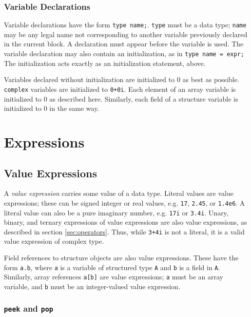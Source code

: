 \documentclass[11pt]{article}
\begin{document}
\subsubsection{Variable Declarations}

Variable declarations have the form \lstinline|type name;|.  \lstinline|type|
must be a data type; \lstinline|name| may be any legal name not
corresponding to another variable previously declared in the current
block.  A declaration must appear before the variable is used.  The
variable declaration may also contain an initialization, as in
\lstinline|type name = expr;|  The initialization acts exactly as an
initialization statement, above.

Variables declared without initialization are initialized to 0 as best
as possible.  \lstinline|complex| variables are initialized to
\lstinline|0+0i|.  Each element of an array variable is initialized to
0 as described here.  Similarly, each field of a structure variable is
initialized to 0 in the same way.

\section{Expressions}

\subsection{Value Expressions}
\label{sec:expr-value}

A \emph{value expression} carries some value of a data type.  Literal
values are value expressions; these can be signed integer or real
values, e.g. \lstinline|17|, \lstinline|2.45|, or \lstinline|1.4e6|.  A literal value
can also be a pure imaginary number, e.g. \lstinline|17i| or \lstinline|3.4i|.
Unary, binary, and ternary expressions of value expressions are also
value expressions, as described in section \ref{sec:operators}.  Thus,
while \lstinline|3+4i| is not a literal, it is a valid value expression of
complex type.

Field references to structure objects are also value expressions.
These have the form \lstinline|a.b|, where \lstinline|a| is a variable of
structured type \lstinline|A| and \lstinline|b| is a field in \lstinline|A|.
Similarly, array references \lstinline|a[b]| are value expressions;
\lstinline|a| must be an array variable, and \lstinline|b| must be an
integer-valued value expression.

\subsubsection{\lstinline|peek| and \lstinline|pop|}
\label{sec:expr-peek-pop}
\end{document}
